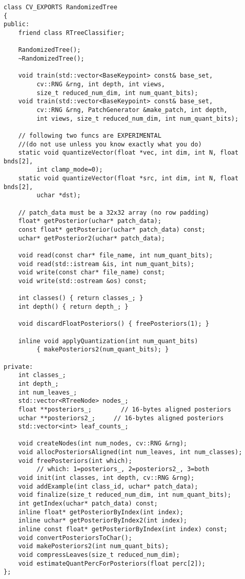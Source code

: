 \begin{lstlisting}
class CV_EXPORTS RandomizedTree
{  
public:
	friend class RTreeClassifier;  

	RandomizedTree();
	~RandomizedTree();

	void train(std::vector<BaseKeypoint> const& base_set,
		 cv::RNG &rng, int depth, int views,
		 size_t reduced_num_dim, int num_quant_bits);
	void train(std::vector<BaseKeypoint> const& base_set,
		 cv::RNG &rng, PatchGenerator &make_patch, int depth,
		 int views, size_t reduced_num_dim, int num_quant_bits);

	// following two funcs are EXPERIMENTAL 
	//(do not use unless you know exactly what you do)
	static void quantizeVector(float *vec, int dim, int N, float bnds[2],
		 int clamp_mode=0);
	static void quantizeVector(float *src, int dim, int N, float bnds[2],
		 uchar *dst);  

	// patch_data must be a 32x32 array (no row padding)
	float* getPosterior(uchar* patch_data);
	const float* getPosterior(uchar* patch_data) const;
	uchar* getPosterior2(uchar* patch_data);

	void read(const char* file_name, int num_quant_bits);
	void read(std::istream &is, int num_quant_bits);
	void write(const char* file_name) const;
	void write(std::ostream &os) const;

	int classes() { return classes_; }
	int depth() { return depth_; }

	void discardFloatPosteriors() { freePosteriors(1); }

	inline void applyQuantization(int num_quant_bits)
		 { makePosteriors2(num_quant_bits); }

private:
	int classes_;
	int depth_;
	int num_leaves_;  
	std::vector<RTreeNode> nodes_;  
	float **posteriors_;        // 16-bytes aligned posteriors
	uchar **posteriors2_;     // 16-bytes aligned posteriors
	std::vector<int> leaf_counts_;

	void createNodes(int num_nodes, cv::RNG &rng);
	void allocPosteriorsAligned(int num_leaves, int num_classes);
	void freePosteriors(int which);   
		 // which: 1=posteriors_, 2=posteriors2_, 3=both
	void init(int classes, int depth, cv::RNG &rng);
	void addExample(int class_id, uchar* patch_data);
	void finalize(size_t reduced_num_dim, int num_quant_bits);  
	int getIndex(uchar* patch_data) const;
	inline float* getPosteriorByIndex(int index);
	inline uchar* getPosteriorByIndex2(int index);
	inline const float* getPosteriorByIndex(int index) const;
	void convertPosteriorsToChar();
	void makePosteriors2(int num_quant_bits);
	void compressLeaves(size_t reduced_num_dim);  
	void estimateQuantPercForPosteriors(float perc[2]);
};
\end{lstlisting}


